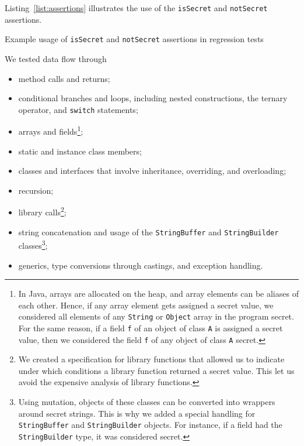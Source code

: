 \begin{example}
  Listing~\ref{list:assertions} illustrates the use of the \verb'isSecret' and \verb'notSecret' assertions.
  \begin{listing}[H]
  \caption{Example usage of \texttt{isSecret} and \texttt{notSecret} assertions in regression tests}
  \label{list:assertions}
\end{listing}
\end{example}

We tested data flow through
\begin{itemize}
  \item method calls and returns;
  \item conditional branches and loops, including nested constructions, the ternary operator, and \verb'switch' statements;
  \item arrays and fields\footnote{%
    In Java, arrays are allocated on the heap, and array elements can be aliases of each other. 
    Hence, if any array element gets assigned a secret value, we considered all elements of any \texttt{String} or \texttt{Object} array in the program secret. 
    For the same reason, if a field \texttt{f} of an object of class \texttt{A} is assigned a secret value, then we considered the field \texttt{f} of any object of class \texttt{A} secret.%
  };
  \item static and instance class members;
  \item classes and interfaces that involve inheritance, overriding, and overloading;
  \item recursion;
  \item library calls\footnote{%
    We created a specification for library functions that allowed us to indicate under which conditions a library function returned a secret value. This let us avoid the expensive analysis of library functions.%
  };
  \item string concatenation and usage of the \texttt{StringBuffer} and \texttt{StringBuilder} classes\footnote{%
    Using mutation, objects of these classes can be converted into wrappers around secret strings. This is why we added a special handling for \texttt{StringBuffer} and \texttt{StringBuilder} objects. For instance, if a field had the  \texttt{StringBuilder} type, it was considered secret.%
  };
  \item generics, type conversions through castings, and exception handling.
\end{itemize}

